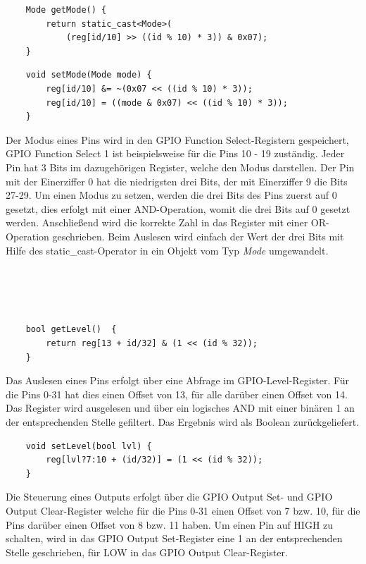 \documentclass[12pt]{article}
\begin{document}
\begin{verbatim}
    Mode getMode() {
        return static_cast<Mode>(
            (reg[id/10] >> ((id % 10) * 3)) & 0x07);
    }
\end{verbatim}
\begin{verbatim}
    void setMode(Mode mode) {
        reg[id/10] &= ~(0x07 << ((id % 10) * 3));
        reg[id/10] = ((mode & 0x07) << ((id % 10) * 3));
    }
\end{verbatim}
\vspace{-2mm}
Der Modus eines Pins wird in den GPIO Function Select-Registern gespeichert, GPIO Function Select 1 ist beispielsweise für die Pins 10 - 19 zuständig. Jeder Pin hat 3 Bits im dazugehörigen Register, welche den Modus darstellen. Der Pin mit der Einerziffer 0 hat die niedrigsten drei Bits, der mit Einerziffer 9 die Bits 27-29. Um einen Modus zu setzen, werden die drei Bits des Pins zuerst auf 0 gesetzt, dies erfolgt mit einer AND-Operation, womit die drei Bits auf 0 gesetzt werden. Anschließend wird die korrekte Zahl in das Register mit einer OR-Operation geschrieben. Beim Auslesen wird einfach der Wert der drei Bits mit Hilfe des static\_cast-Operator in ein Objekt vom Typ \textit{Mode} umgewandelt.\\\\\\\\\\
\begin{verbatim}
    bool getLevel()  {
        return reg[13 + id/32] & (1 << (id % 32));
    }
\end{verbatim}
Das Auslesen eines Pins erfolgt über eine Abfrage im GPIO-Level-Register. Für die Pins 0-31 hat dies einen Offset von 13, für alle darüber einen Offset von 14. Das Register wird ausgelesen und über ein logisches AND mit einer binären 1 an der entsprechenden Stelle gefiltert. Das Ergebnis wird als Boolean zurückgeliefert.\\
\begin{verbatim}
    void setLevel(bool lvl) {
        reg[lvl?7:10 + (id/32)] = (1 << (id % 32));
    }
\end{verbatim}
\vspace{-2mm}
Die Steuerung eines Outputs erfolgt über die GPIO Output Set- und GPIO Output Clear-Register welche für die Pins 0-31 einen Offset von 7 bzw. 10, für die Pins darüber einen Offset von 8 bzw. 11 haben. Um einen Pin auf HIGH zu schalten, wird in das GPIO Output Set-Register eine 1 an der entsprechenden Stelle geschrieben, für LOW in das GPIO Output Clear-Register. 
\end{document}
